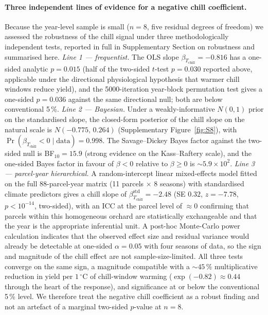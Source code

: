 \documentclass[agronomy,article,submit,pdftex,moreauthors]{Definitions/mdpi}
\begin{document}
\paragraph{Three independent lines of evidence for a negative chill coefficient.} Because the year-level sample is small ($n=8$, five residual degrees of freedom) we assessed the robustness of the chill signal under three methodologically independent tests, reported in full in Supplementary Section on robustness and summarised here.
\emph{Line 1 --- frequentist.} The OLS slope $\beta_{T_{\text{chill}}}=-0.816$ has a one-sided analytic $p=0.015$ (half of the two-sided $t$-test $p=0.030$ reported above, applicable under the directional physiological hypothesis that warmer chill windows reduce yield), and the 5000-iteration year-block permutation test gives a one-sided $p=0.036$ against the same directional null; both are below conventional 5\,\%.
\emph{Line 2 --- Bayesian.} Under a weakly-informative $N(0,1)$ prior on the standardised slope, the closed-form posterior of the chill slope on the natural scale is $N(-0.775,\,0.264)$ (Supplementary Figure~\ref{fig:S8}), with $\Pr(\beta_{T_{\text{chill}}}<0 \mid \text{data})=0.998$. The Savage--Dickey Bayes factor against the two-sided null is BF$_{10}=15.9$ (strong evidence on the Kass--Raftery scale), and the one-sided Bayes factor in favour of $\beta<0$ relative to $\beta\geq 0$ is $\sim 5.9\times 10^{2}$.
\emph{Line 3 --- parcel-year hierarchical.} A random-intercept linear mixed-effects model fitted on the full 88-parcel-year matrix (11 parcels $\times$ 8 seasons) with standardised climate predictors gives a chill slope of $\beta_{T_{\text{chill}}}^{\text{std}}=-2.48$ (SE $0.32$, $z=-7.78$, $p<10^{-14}$, two-sided), with an ICC at the parcel level of $\approx 0$ confirming that parcels within this homogeneous orchard are statistically exchangeable and that the year is the appropriate inferential unit. A post-hoc Monte-Carlo power calculation indicates that the observed effect size and residual variance would already be detectable at one-sided $\alpha=0.05$ with four seasons of data, so the sign and magnitude of the chill effect are not sample-size-limited.
All three tests converge on the same sign, a magnitude compatible with a $\sim 45\,\%$ multiplicative reduction in yield per $1\,^{\circ}$C of chill-window warming ($\exp(-0.82)\approx 0.44$ through the heart of the response), and significance at or below the conventional 5\,\% level. We therefore treat the negative chill coefficient as a robust finding and not an artefact of a marginal two-sided $p$-value at $n=8$.
\end{document}
